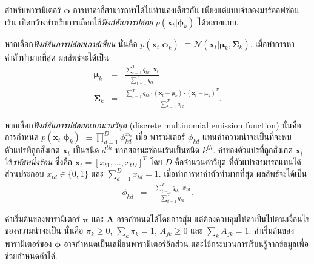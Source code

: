 สำหรับพารามิเตอร์ $\bm{\phi}$ การหาค่าก็สามารถทำได้ในทำนองเดียวกัน
เพียงแต่แบบจำลองมาร์คอฟซ่อนเร้น เปิดกว้างสำหรับการเลือกใช้\textit{ฟังก์ชันการปล่อย} 
$p(\bm{x}_t|\bm{\phi}_k)$
ได้หลายแบบ.

หากเลือก\textit{ฟังก์ชันการปล่อยเกาส์เซียน} นั่นคือ
$p(\bm{x}_t|\bm{\phi}_k)$
$\equiv \mathcal{N}(\bm{x}_t|\bm{\mu}_k, \bm{\Sigma}_k)$.
เมื่อทำการหาค่าตัวทำมากที่สุด ผลลัพธ์จะได้เป็น
\begin{eqnarray}
\bm{\mu}_k 
&=& \frac{\sum_{t=1}^T q_{tk} \cdot \bm{x}_t }{ \sum_{t=1}^T q_{tk} }
\label{eq: HMM M step Gaussian mu} \\
\bm{\Sigma}_k 
&=& \frac{\sum_{t=1}^T q_{tk} \cdot (\bm{x}_t - \bm{\mu}_k) \cdot (\bm{x}_t - \bm{\mu}_k)^T }{ \sum_{t=1}^T q_{tk} }
\label{eq: HMM M step Gaussian sigma} .
\end{eqnarray}

หากเลือก\textit{ฟังก์ชันการปล่อยอเนกนามวิยุต} (discrete multinomial emission function) 
นั่นคือ การกำหนด
$p(\bm{x}_t|\bm{\phi}_k)$
$\equiv \prod_{d=1}^D \phi_{kd}^{x_{td}}$
เมื่อ 
พารามิเตอร์ $\phi_{kd}$ แทนค่าความน่าจะเป็นที่จะพบตัวแปรที่ถูกสังเกต $\bm{x}_t$ เป็นชนิด $d^{th}$ หากสถานะซ่อนเร้นเป็นชนิด $k^{th}$.
ค่าของตัวแปรที่ถูกสังเกต $\bm{x}_t$ ใช้\textit{รหัสหนึ่งร้อน}
ซึ่งคือ $\bm{x}_t = [x_{t1}, \ldots, x_{tD}]^T$ โดย $D$ คือจำนวนค่าวิยุต ที่ตัวแปรสามารถแทนได้.
ส่วนประกอบ $x_{td} \in \{0,1\}$ และ $\sum_{d=1}^D x_{td} = 1$.
เมื่อทำการหาค่าตัวทำมากที่สุด ผลลัพธ์จะได้เป็น
\begin{eqnarray}
\phi_{kd} 
&=& \frac{\sum_{t=1}^T q_{tk} \cdot x_{td} }{ \sum_{t=1}^T q_{tk} }
\label{eq: HMM M step multinomial phi}.
\end{eqnarray}

ค่าเริ่มต้นของพารามิเตอร์ $\bm{\pi}$ และ $\bm{A}$ อาจกำหนดได้โดยการสุ่ม แต่ต้องควบคุมให้ค่าเป็นไปตามเงื่อนไขของความน่าจะเป็น
นั่นคือ $\pi_k \geq 0$, $\sum_k \pi_k = 1$, $A_{jk} \geq 0$ และ $\sum_k A_{jk} = 1$.
ค่าเริ่มต้นของพารามิเตอร์ของ $\bm{\phi}$ 
อาจกำหนดเป็นเสมือนพารามิเตอร์อีกส่วน และใช้กระบวนการเรียนรู้จากข้อมูลเพื่อช่วยกำหนดค่าได้.
%

